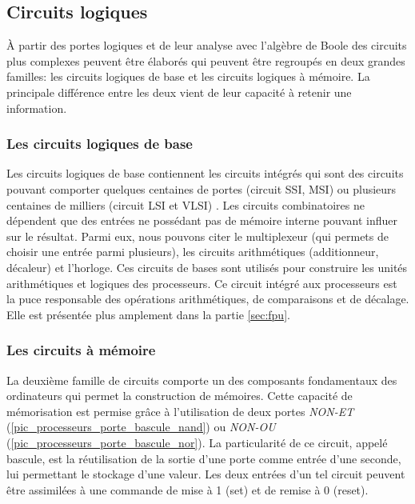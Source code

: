 \subsection{Circuits logiques}
À partir des portes logiques et de leur analyse avec l'algèbre de Boole des circuits plus complexes peuvent être élaborés qui peuvent être regroupés en deux grandes familles: les circuits logiques de base  et les circuits logiques à mémoire. La principale différence entre les deux vient de leur capacité à retenir une information. 

\subsubsection{Les circuits logiques de base}
Les circuits logiques de base contiennent les circuits intégrés qui sont des circuits pouvant comporter quelques centaines de portes (circuit SSI, MSI) ou plusieurs centaines de milliers (circuit LSI et VLSI) \cite{barbe2013very}.
Les circuits combinatoires ne dépendent que des entrées ne possédant pas de mémoire interne pouvant influer sur le résultat. Parmi eux, nous pouvons citer le multiplexeur (qui permets de choisir une entrée parmi plusieurs), les circuits arithmétiques (additionneur, décaleur) et l’horloge. 
Ces circuits de bases sont utilisés pour construire les unités arithmétiques et logiques des processeurs. Ce circuit intégré aux processeurs est la puce responsable des opérations arithmétiques, de comparaisons et de décalage. Elle est présentée plus amplement dans la partie \autoref{sec:fpu}.


\subsubsection{Les circuits à mémoire}
La deuxième famille de circuits comporte un des composants fondamentaux des ordinateurs qui permet la construction de mémoires. Cette capacité de mémorisation est permise grâce à l'utilisation de deux portes \textit{NON-ET} (\autoref{pic_processeurs_porte_bascule_nand}) ou \textit{NON-OU} (\autoref{pic_processeurs_porte_bascule_nor}). La particularité de ce circuit, appelé bascule, est la réutilisation de la sortie d'une porte comme entrée d'une seconde, lui permettant le stockage d'une valeur. 
Les deux entrées d'un tel circuit peuvent être assimilées à une commande de mise à 1 (set) et de remise à 0 (reset).

